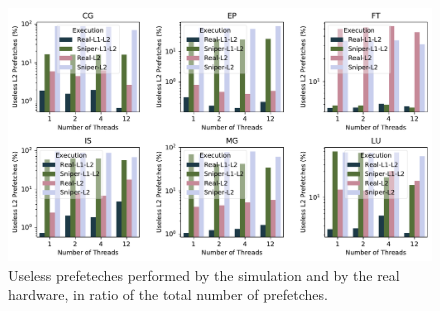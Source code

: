 \documentclass[AMA,final,STIX1COL]{WileyNJD-v2}
\newcommand{\vsg}[1]{\textcolor{blue}{\bfseries \ul{vsgirelli: #1} }\vspace{0.2cm}}
\begin{document}








\begin{figure}
    \centering
    \includegraphics[width=.8\linewidth]{figures/sniper_useless_pf_ratio.pdf}
    \caption{Useless prefeteches performed by the simulation and by the real hardware, in ratio of the total number of prefetches.}
    \label{fig:sniper_useless_pf_ratio}
\end{figure}
\end{document}
